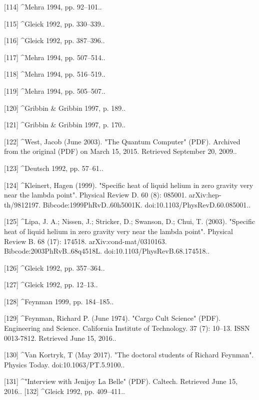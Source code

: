[114]
^Mehra 1994, pp. 92–101..

[115]
^Gleick 1992, pp. 330–339..

[116]
^Gleick 1992, pp. 387–396..

[117]
^Mehra 1994, pp. 507–514..

[118]
^Mehra 1994, pp. 516–519..

[119]
^Mehra 1994, pp. 505–507..

[120]
^Gribbin & Gribbin 1997, p. 189..

[121]
^Gribbin & Gribbin 1997, p. 170..

[122]
^West, Jacob (June 2003). "The Quantum Computer" (PDF). Archived from the original (PDF) on March 15, 2015. Retrieved September 20, 2009..

[123]
^Deutsch 1992, pp. 57–61..

[124]
^Kleinert, Hagen (1999). "Specific heat of liquid helium in zero gravity very near the lambda point". Physical Review D. 60 (8): 085001. arXiv:hep-th/9812197. Bibcode:1999PhRvD..60h5001K. doi:10.1103/PhysRevD.60.085001..

[125]
^Lipa, J. A.; Nissen, J.; Stricker, D.; Swanson, D.; Chui, T. (2003). "Specific heat of liquid helium in zero gravity very near the lambda point". Physical Review B. 68 (17): 174518. arXiv:cond-mat/0310163. Bibcode:2003PhRvB..68q4518L. doi:10.1103/PhysRevB.68.174518..

[126]
^Gleick 1992, pp. 357–364..

[127]
^Gleick 1992, pp. 12–13..

[128]
^Feynman 1999, pp. 184–185..

[129]
^Feynman, Richard P. (June 1974). "Cargo Cult Science" (PDF). Engineering and Science. California Institute of Technology. 37 (7): 10–13. ISSN 0013-7812. Retrieved June 15, 2016..

[130]
^Van Kortryk, T (May 2017). "The doctoral students of Richard Feynman". Physics Today. doi:10.1063/PT.5.9100..

[131]
^"Interview with Jenijoy La Belle" (PDF). Caltech. Retrieved June 15, 2016..
[132]
^Gleick 1992, pp. 409–411..

